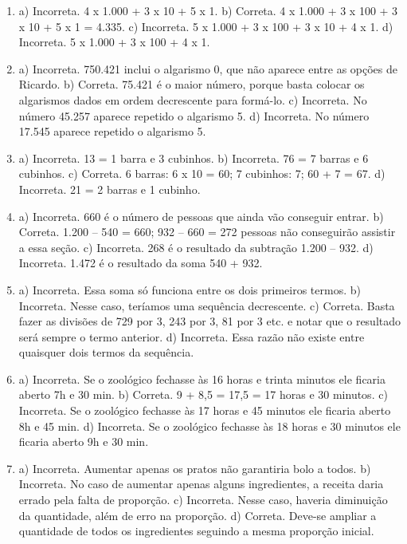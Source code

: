 
\begin{enumerate}
\item
a) Incorreta. 4 x 1.000 + 3 x 10 + 5 x 1.
b) Correta. 4 x 1.000 + 3 x 100 + 3 x 10 + 5 x 1 = 4.335.
c) Incorreta. 5 x 1.000 + 3 x 100 + 3 x 10 + 4 x 1.
d) Incorreta. 5 x 1.000 + 3 x 100 + 4 x 1.

\item
a) Incorreta. 750.421 inclui o algarismo 0, que não aparece entre as opções de Ricardo.
b) Correta. 75.421 é o maior número, porque basta colocar os algarismos dados em ordem decrescente para formá-lo.
c) Incorreta. No número 45.257 aparece repetido o algarismo 5. 
d) Incorreta. No número 17.545 aparece repetido o algarismo 5. 

\item
a) Incorreta. 13 = 1 barra e 3 cubinhos.
b) Incorreta. 76 = 7 barras e 6 cubinhos.
c) Correta. 6 barras: 6 x 10 = 60; 7 cubinhos: 7; 60 + 7 = 67.
d) Incorreta. 21 = 2 barras e 1 cubinho.

\item
a) Incorreta. 660 é o número de pessoas que ainda vão conseguir entrar.
b) Correta. 1.200 -- 540 = 660; 932 -- 660 = 272 pessoas não conseguirão assistir a essa seção.
c) Incorreta. 268 é o resultado da subtração 1.200 -- 932.
d) Incorreta. 1.472 é o resultado da soma 540 + 932.

\item
a) Incorreta. Essa soma só funciona entre os dois primeiros termos.
b) Incorreta. Nesse caso, teríamos uma sequência decrescente.
c) Correta. Basta fazer as divisões de 729 por 3, 243 por 3, 81 por 3 etc. e notar que o resultado será sempre o termo anterior.
d) Incorreta. Essa razão não existe entre quaisquer dois termos da sequência.

\item
a) Incorreta. Se o zoológico fechasse às 16 horas e trinta minutos ele ficaria aberto 7h e 30 min.
b) Correta. 9 + 8,5 = 17,5 = 17 horas e 30 minutos.
c) Incorreta. Se o zoológico fechasse às 17 horas e 45 minutos ele ficaria aberto 8h e 45 min.
d) Incorreta. Se o zoológico fechasse às 18 horas e 30 minutos ele ficaria aberto 9h e 30 min.

\item
a) Incorreta. Aumentar apenas os pratos não garantiria bolo a todos.
b) Incorreta. No caso de aumentar apenas alguns ingredientes, a receita daria errado pela falta de proporção.
c) Incorreta. Nesse caso, haveria diminuição da quantidade, além de erro na proporção.
d) Correta. Deve-se ampliar a quantidade de todos os ingredientes seguindo a mesma proporção inicial.


\end{enumerate}
